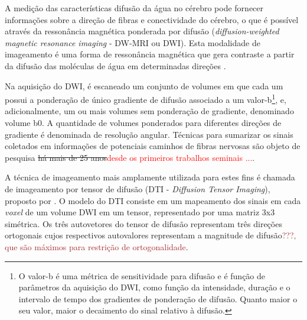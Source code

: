 \documentclass[
    12pt,                %
    oneside,            %
    a4paper,            %
    english,            %
    french,                %
    spanish,            %
    brazil                %
    ]{abntex2}
\begin{document}
A medição das características difusão da água no cérebro pode fornecer informações sobre a direção de fibras e conectividade do cérebro, o que é possível através da ressonância magnética ponderada por difusão (\textit{diffusion-weighted magnetic resonance imaging} - DW-MRI ou DWI).
Esta modalidade de imageamento é uma forma de ressonância magnética que gera contraste a partir da difusão das moléculas de água em determinadas direções \cite{DTI_Handbook}. %




Na aquisição do DWI, é escaneado um conjunto de volumes em que cada um possui a ponderação de único gradiente de difusão associado a um valor-b\footnote{O valor-b é uma métrica de sensitividade para difusão e é função de parâmetros da aquisição do DWI, como função da intensidade, duração e o intervalo de tempo dos gradientes de ponderação de difusão. Quanto maior o seu valor, maior o decaimento do sinal relativo à difusão.}, e, adicionalmente, um ou mais volumes sem ponderação de gradiente, denominado volume b0. A quantidade de volumes ponderados para diferentes direções de gradiente é denominada de resolução angular. Técnicas para sumarizar os sinais coletados em informações de potenciais caminhos de fibras nervosas são objeto de pesquisa \sout{há mais de 25 anos}\textcolor{red}{desde os primeiros trabalhos seminais ...}.

A técnica de imageamento mais amplamente utilizada para estes fins é chamada de imageamento por tensor de difusão (DTI - \textit{Diffusion Tensor Imaging}), proposto por . 
O modelo do DTI consiste em um mapeamento dos sinais em cada \textit{voxel} de um volume DWI em um tensor, representado por uma matriz 3x3 simétrica. Os três autovetores do tensor de difusão representam três direções ortogonais cujos respectivos autovalores representam a magnitude de difusão\textcolor{brown}{???, que são máximos para restrição de ortogonalidade}.
\end{document}
